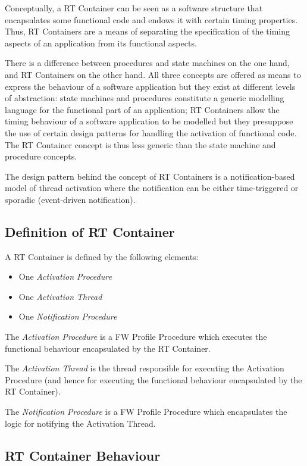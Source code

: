 \documentclass[a4paper,10pt]{article}
\begin{document}
Conceptually, a RT Container can be seen as a software structure that encapsulates some
functional code and endows it with certain timing properties. Thus, RT Containers are a means of separating the specification of the timing aspects of an application from its functional aspects.

There is a difference between procedures and state machines on the one hand, and RT Containers on the other hand. All three concepts are offered as means to express the behaviour of a software application but they exist at different levels of abstraction: state machines and procedures constitute a generic modelling language for the functional part of an application; RT Containers allow the timing behaviour of a software application to be modelled but they presuppose the use of certain design patterns for handling the activation of functional code. The RT Container concept is thus less generic than the state machine and procedure concepts.

The design pattern behind the concept of RT Containers is a notification-based model of thread activation where the notification can be either time-triggered or sporadic (event-driven notification).

\subsection{Definition of RT Container}
A RT Container is defined by the following elements:

\begin{itemize}[itemsep=0mm]
\item One \emph{Activation Procedure}
\item One \emph{Activation Thread}
\item One \emph{Notification Procedure} 
\end{itemize}

The \emph{Activation Procedure} is a FW Profile Procedure which executes the functional behaviour encapsulated by the RT Container.

The \emph{Activation Thread} is the thread responsible for executing the Activation Procedure (and hence for executing the functional behaviour encapsulated by the RT Container).

The \emph{Notification Procedure} is a FW Profile Procedure which encapsulates the logic for notifying the Activation Thread.

\subsection{RT Container Behaviour}\label{sec:rtContainersBehaviour}

\end{document}

